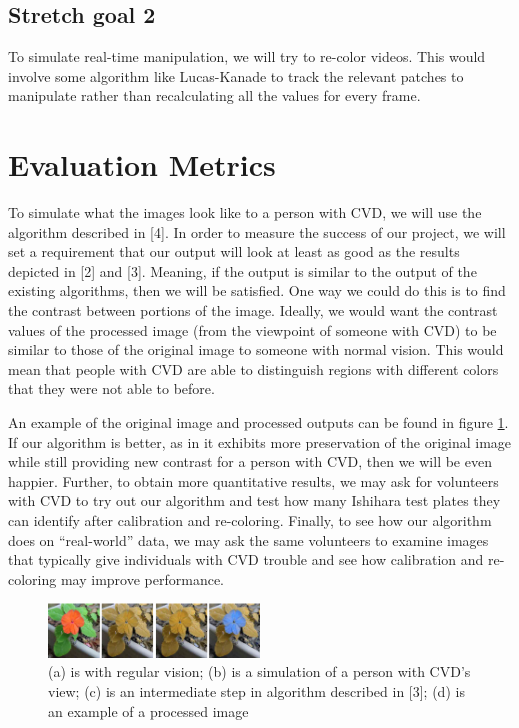\documentclass[10pt,twocolumn,letterpaper]{article}
\begin{document}
\subsection{Stretch goal 2}

To simulate real-time manipulation, we will try to re-color videos. This would involve some algorithm like Lucas-Kanade to track the relevant patches to manipulate rather than recalculating all the values for every frame. 

\section{Evaluation Metrics}

To simulate what the images look like to a person with CVD, we will use the algorithm described in [4]. In order to measure the success of our project, we will set a requirement that our output will look at least as good as the results depicted in [2] and [3]. Meaning, if the output is similar to the output of the existing algorithms, then we will be satisfied. One way we could do this is to find the contrast between portions of the image. Ideally, we would want the contrast values of the processed image (from the viewpoint of someone with CVD) to be similar to those of the original image to someone with normal vision. This would mean that people with CVD are able to distinguish regions with different colors that they were not able to before. 

An example of the original image and processed outputs can be found in figure \ref{fig:flowers}. If our algorithm is better, as in it exhibits more preservation of the original image while still providing new contrast for a person with CVD, then we will be even happier. Further, to obtain more quantitative results, we may ask for volunteers with CVD to try out our algorithm and test how many Ishihara test plates they can identify after calibration and re-coloring. Finally, to see how our algorithm does on ``real-world'' data, we may ask the same volunteers to examine images that typically give individuals with CVD trouble and see how calibration and re-coloring may improve performance. 

\begin{figure}[h]
  \includegraphics[width=0.5\textwidth]{flowers.png}
  \caption{(a) is with regular vision; (b) is a simulation of a person with CVD's view; (c) is an intermediate step in algorithm described in [3]; (d) is an example of a processed image}
  \label{fig:flowers}
\end{figure}
\end{document}
